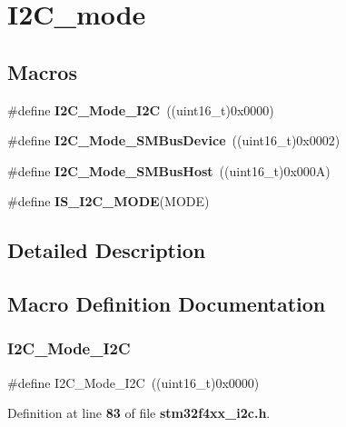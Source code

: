 \section{I2\+C\+\_\+mode}
\label{group__I2C__mode}
\subsection*{Macros}
\begin{DoxyCompactItemize}
\item 
\#define \textbf{ I2\+C\+\_\+\+Mode\+\_\+\+I2C}~((uint16\+\_\+t)0x0000)
\item 
\#define \textbf{ I2\+C\+\_\+\+Mode\+\_\+\+S\+M\+Bus\+Device}~((uint16\+\_\+t)0x0002)
\item 
\#define \textbf{ I2\+C\+\_\+\+Mode\+\_\+\+S\+M\+Bus\+Host}~((uint16\+\_\+t)0x000\+A)
\item 
\#define \textbf{ I\+S\+\_\+\+I2\+C\+\_\+\+M\+O\+DE}(M\+O\+DE)
\end{DoxyCompactItemize}


\subsection{Detailed Description}


\subsection{Macro Definition Documentation}
\mbox{\label{group__I2C__mode_ga8bc3b0555ca31b6f8423bc2ada45d1ac}} 
\subsubsection{I2\+C\+\_\+\+Mode\+\_\+\+I2C}
{\footnotesize\ttfamily \#define I2\+C\+\_\+\+Mode\+\_\+\+I2C~((uint16\+\_\+t)0x0000)}



Definition at line \textbf{ 83} of file \textbf{ stm32f4xx\+\_\+i2c.\+h}.

\mbox{\label{group__I2C__mode_gaf0cf66bc1f4986ba8a9925da924e06da}} 
